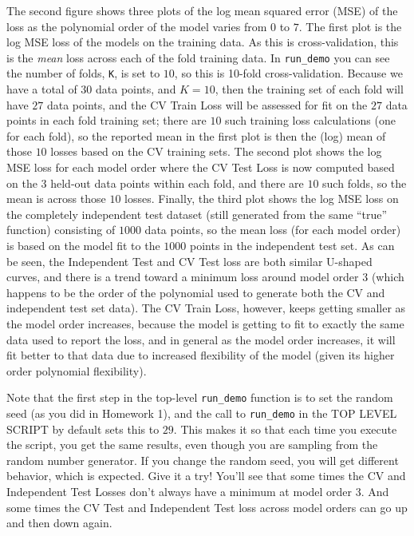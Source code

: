 \documentclass[10pt]{article}
\begin{document}
\begin{itemize}
The second figure shows three plots of the log mean squared error (MSE) of the loss as the polynomial order of the model varies from $0$ to $7$. The first plot is the log MSE loss of the models on the training data. As this is cross-validation, this is the {\em mean} loss across each of the fold training data. In {\tt run\_demo} you can see the number of folds, {\tt K}, is set to $10$, so this is 10-fold cross-validation. Because we have a total of $30$ data points, and $K=10$, then the training set of each fold will have $27$ data points, and the CV Train Loss will be assessed for fit on the $27$ data points in each fold training set; there are $10$ such training loss calculations (one for each fold), so the reported mean in the first plot is then the (log) mean of those $10$ losses based on the CV training sets. The second plot shows the log MSE loss for each model order where the CV Test Loss is now computed based on the $3$ held-out data points within each fold, and there are $10$ such folds, so the mean is across those $10$ losses. Finally, the third plot shows the log MSE loss on the completely independent test dataset (still generated from the same ``true'' function) consisting of $1000$ data points, so the mean loss (for each model order) is based on the model fit to the $1000$ points in the independent test set. As can be seen, the Independent Test and CV Test loss are both similar U-shaped curves, and there is a trend toward a minimum loss around model order 3 (which happens to be the order of the polynomial used to generate both the CV and independent test set data). The CV Train Loss, however, keeps getting smaller as the model order increases, because the model is getting to fit to exactly the same data used to report the loss, and in general as the model order increases, it will fit better to that data due to increased flexibility of the model (given its higher order polynomial flexibility).

Note that the first step in the top-level {\tt run\_demo} function is to set the random seed (as you did in Homework 1), and the call to {\tt run\_demo} in the TOP LEVEL SCRIPT by default sets this to $29$. This makes it so that each time you execute the script, you get the same results, even though you are sampling from the random number generator. If you change the random seed, you will get different behavior, which is expected. Give it a try! You'll see that some times the CV and Independent Test Losses don't always have a minimum at model order 3. And some times the CV Test and Independent Test loss across model orders can go up and then down again.


\end{itemize}
\end{document}
